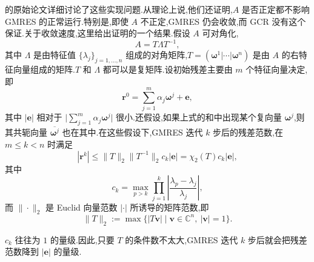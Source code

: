 的原始论文详细讨论了这些实现问题.从理论上说,他们还证明,\(A\) 是否正定都不影响 GMRES 的正常运行.特别是,即使 \(A\) 不正定,GMRES 仍会收敛,而 GCR 没有这个保证.关于收敛速度,这里给出证明的一个结果.假设 \(A\) 可对角化,
\begin{equation}\label{eq:2.6.21}
  A=T\Lambda T^{-1},
\end{equation}
其中 \(\Lambda\) 是由特征值 \(\{\lambda_j\}_{j=1,\ldots,n}\) 组成的对角矩阵,\(T=(\boldsymbol{\omega}^1|\cdots|\boldsymbol{\omega}^n)\) 是由 \(A\) 的右特征向量组成的矩阵.\(T\) 和 \(\Lambda\) 都可以是复矩阵.设初始残差主要由 \(m\) 个特征向量决定,即
\[
  \boldsymbol{r}^0=\sum_{j=1}^m\alpha_j\boldsymbol{\omega}^j+\boldsymbol{e},
\]
其中 \(|\boldsymbol{e}|\) 相对于 \(\bigl|\sum_{j=1}^m\alpha_j\boldsymbol{\omega}^j\bigr|\) 很小.还假设,如果上式的和中出现某个复向量 \(\boldsymbol{\omega}^j\),则其共轭向量 \(\overline{\boldsymbol{\omega}^j}\) 也在其中.在这些假设下,GMRES 迭代 \(k\) 步后的残差范数,在 \(m\le k<n\) 时满足
\begin{equation}\label{eq:2.6.22}
  |\boldsymbol{r}^k|\le\|T\|_2\|T^{-1}\|_2c_k|\boldsymbol{e}|
    =\chi_2(T)c_k|\boldsymbol{e}|,
\end{equation}
其中
\[
  c_k=\max_{p>k}\prod_{j=1}^k\left|\frac{\lambda_p-\lambda_j}{\lambda_j}\right|,
\]
而 \(\|\cdot\|_2\) 是 Euclid 向量范数 \(|\cdot|\) 所诱导的矩阵范数,即
\[
  \|T\|_2:=\max\{|T\boldsymbol{v}|\mid\boldsymbol{v}\in\mathbb C^n,\ |\boldsymbol{v}|=1\}.
\]

\(c_k\) 往往为 \(1\) 的量级.因此,只要 \(T\) 的条件数不太大,GMRES 迭代 \(k\) 步后就会把残差范数降到 \(|\boldsymbol{e}|\) 的量级.

